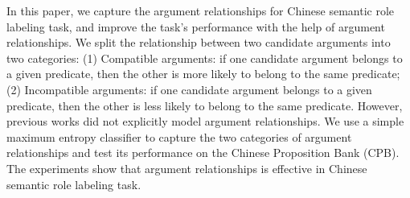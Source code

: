 In this paper, we capture the argument relationships for Chinese semantic role labeling task, and improve the task's performance with the help  of argument relationships. We split the  relationship between two candidate arguments into two categories: (1) Compatible arguments: if one candidate argument belongs to a given predicate, then the other is more likely to belong to the same predicate; (2) Incompatible arguments: if one candidate argument belongs to a given predicate, then the other is less likely to belong to the same predicate. However, previous works did not explicitly model   argument relationships. We use a simple maximum entropy classifier to capture the two categories of argument relationships and test its performance on the Chinese Proposition Bank (CPB). The experiments show that argument relationships is effective in Chinese semantic role labeling task.

